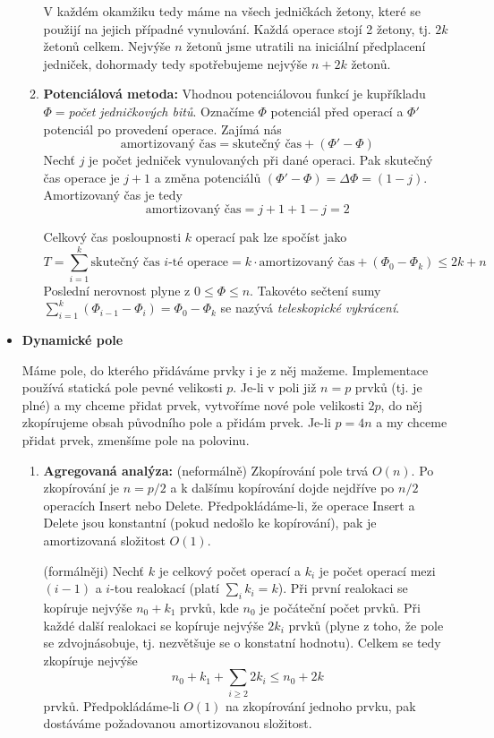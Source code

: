 \documentclass[11pt]{report} %
\numberwithin{equation}{section}
\begin{document}
\begin{itemize}
\begin{enumerate}
		V každém okamžiku tedy máme na všech jedničkách žetony, které se použijí na jejich případné vynulování. Každá operace stojí 2 žetony, tj. $2k$ žetonů celkem. Nejvýše $n$ žetonů jsme utratili na iniciální předplacení jedniček, dohormady tedy spotřebujeme nejvýše $n + 2k$ žetonů.
		
		\item\textbf{Potenciálová metoda:} Vhodnou potenciálovou funkcí je kupříkladu $\Phi = $\textit{počet jedničkových bitů}. Označíme $\Phi$ potenciál před operací a $\Phi'$ potenciál po provedení operace. Zajímá nás
		$$\text{amortizovaný čas} = \text{skutečný čas} + (\Phi' - \Phi)$$
		Nechť $j$ je počet jedniček vynulovaných při dané operaci. Pak skutečný čas operace je $j+1$ a změna potenciálů $(\Phi' - \Phi) = \Delta\Phi = (1-j)$. Amortizovaný čas je tedy
		$$\text{amortizovaný čas} = j+1 + 1-j = 2$$
		
		Celkový čas posloupnosti $k$ operací pak lze spočíst jako
		$$T = \sum_{i=1}^{k}\text{skutečný čas $i$-té operace} =  k\cdot\text{amortizovaný čas} + (\Phi_0 - \Phi_k) \leq 2k + n$$
		Poslední nerovnost plyne z $0 \leq \Phi \leq n$. Takovéto sečtení sumy $\sum_{i=1}^{k}(\Phi_{i-1} - \Phi_{i}) = \Phi_0 - \Phi_k$ se nazývá \textit{teleskopické vykrácení}.
	\end{enumerate}

	\item \textbf{Dynamické pole}
	
	Máme pole, do kterého přidáváme prvky i je z něj mažeme. Implementace používá statická pole pevné velikosti $p$. Je-li v poli již $n = p$ prvků (tj. je plné) a my chceme přidat prvek, vytvoříme nové pole velikosti $2p$, do něj zkopírujeme obsah původního pole a přidám prvek. Je-li $p = 4n$ a my chceme přidat prvek, zmenšíme pole na polovinu.
	
	\begin{enumerate}
		\item \textbf{Agregovaná analýza:} (neformálně) Zkopírování pole trvá $O(n)$. Po zkopírování je $n = p/2$ a k dalšímu kopírování dojde nejdříve po $n/2$ operacích Insert nebo Delete. Předpokládáme-li, že operace Insert a Delete jsou konstantní (pokud nedošlo ke kopírování), pak je amortizovaná složitost $O(1)$.
		
		(formálněji) Nechť $k$ je celkový počet operací a $k_i$ je počet operací mezi $(i-1)$ a $i$-tou realokací (platí $\sum_{i} k_i = k$). Při první realokaci se kopíruje nejvýše $n_0 + k_1$ prvků, kde $n_0$ je počáteční počet prvků. Při každé další realokaci se kopíruje nejvýše $2k_i$ prvků (plyne z toho, že pole se zdvojnásobuje, tj. nezvětšuje se o konstatní hodnotu). Celkem se tedy zkopíruje nejvýše
		$$n_0 + k_1 + \sum_{i \geq 2} 2k_i \leq n_0 + 2k$$
		prvků. Předpokládáme-li $O(1)$ na zkopírování jednoho prvku, pak dostáváme požadovanou amortizovanou složitost.
		

\end{enumerate}
\end{itemize}
\end{document}
